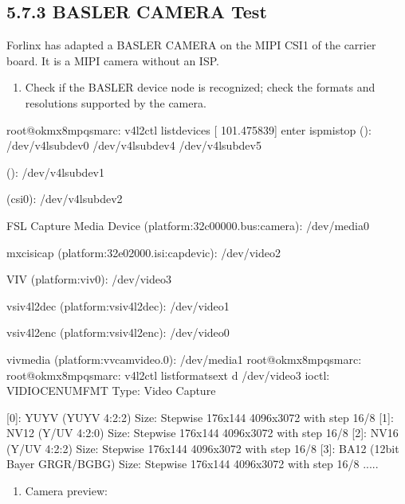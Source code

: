 \documentclass[letterpaper,10pt,openany,english]{sphinxmanual}
\begin{document}
\subsection{5.7.3 BASLER CAMERA Test}
\label{\detokenize{linux-manual:basler-camera-test}}
\sphinxAtStartPar
Forlinx has adapted a BASLER CAMERA on the MIPI CSI1 of the carrier board. It is a MIPI camera without an ISP.
\begin{enumerate}
%
\item {} 
\sphinxAtStartPar
Check if the BASLER device node is recognized; check the formats and resolutions supported by the camera.

\end{enumerate}

\begin{sphinxVerbatim}[commandchars=\\\{\}]
root@ok\PYGZhy{}mx8mpq\PYGZhy{}smarc:\PYGZti{}\PYGZsh{} v4l2\PYGZhy{}ctl \PYGZhy{}\PYGZhy{}list\PYGZhy{}devices
[  101.475839] enter isp\PYGZus{}mi\PYGZus{}stop
 ():
        /dev/v4l\PYGZhy{}subdev0
        /dev/v4l\PYGZhy{}subdev4
        /dev/v4l\PYGZhy{}subdev5

 ():
        /dev/v4l\PYGZhy{}subdev1

 (csi0):
        /dev/v4l\PYGZhy{}subdev2

FSL Capture Media Device (platform:32c00000.bus:camera):
        /dev/media0

mxc\PYGZhy{}isi\PYGZhy{}cap (platform:32e02000.isi:cap\PYGZus{}devic):
        /dev/video2

VIV (platform:viv0):
        /dev/video3

vsi\PYGZus{}v4l2dec (platform:vsi\PYGZus{}v4l2dec):
        /dev/video1

vsi\PYGZus{}v4l2enc (platform:vsi\PYGZus{}v4l2enc):
        /dev/video0

viv\PYGZus{}media (platform:vvcam\PYGZhy{}video.0):
        /dev/media1
root@ok\PYGZhy{}mx8mpq\PYGZhy{}smarc:\PYGZti{}\PYGZsh{} 
root@ok\PYGZhy{}mx8mpq\PYGZhy{}smarc:\PYGZti{}\PYGZsh{} v4l2\PYGZhy{}ctl \PYGZhy{}\PYGZhy{}list\PYGZhy{}formats\PYGZhy{}ext \PYGZhy{}d /dev/video3
ioctl: VIDIOC\PYGZus{}ENUM\PYGZus{}FMT
        Type: Video Capture

        [0]: \PYGZsq{}YUYV\PYGZsq{} (YUYV 4:2:2)
                Size: Stepwise 176x144 \PYGZhy{} 4096x3072 with step 16/8
        [1]: \PYGZsq{}NV12\PYGZsq{} (Y/UV 4:2:0)
                Size: Stepwise 176x144 \PYGZhy{} 4096x3072 with step 16/8
        [2]: \PYGZsq{}NV16\PYGZsq{} (Y/UV 4:2:2)
                Size: Stepwise 176x144 \PYGZhy{} 4096x3072 with step 16/8
        [3]: \PYGZsq{}BA12\PYGZsq{} (12\PYGZhy{}bit Bayer GRGR/BGBG)
                Size: Stepwise 176x144 \PYGZhy{} 4096x3072 with step 16/8
.....
\end{sphinxVerbatim}
\begin{enumerate}
%
\setcounter{enumi}{1}
\item {} 
\sphinxAtStartPar
Camera preview:

\end{enumerate}
\end{document}
